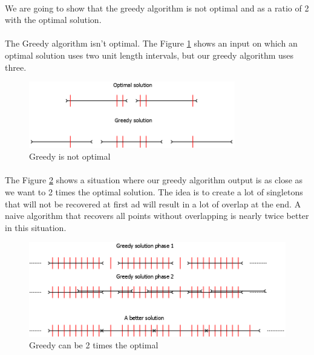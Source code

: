 \paragraph{}
We are going to show that the greedy algorithm is not optimal and as a ratio of 2 with the optimal solution.

\paragraph{}
The Greedy algorithm isn't optimal. The Figure \ref{fig:Diagramme1} shows an input on which an optimal solution uses two unit length intervals, but our greedy algorithm uses three. 

\begin{figure}[h]
	\centering
		\includegraphics[width=9cm]{Diagramme1.png}
	\caption{Greedy is not optimal}
	\label{fig:Diagramme1}
\end{figure}

\paragraph{}
The Figure \ref{fig:Diagramme2} shows a situation where our greedy algorithm output is as close as we want to 2 times the optimal solution. The idea is to create a lot of singletons that will not be recovered at first ad will result in a lot of overlap at the end. A naive algorithm that recovers all points without overlapping is nearly twice better in this situation.

\begin{figure}[h]
	\centering
		\includegraphics[width=13cm]{Diagramme2.png}
	\caption{Greedy can be 2 times the optimal}
	\label{fig:Diagramme2}
\end{figure}

